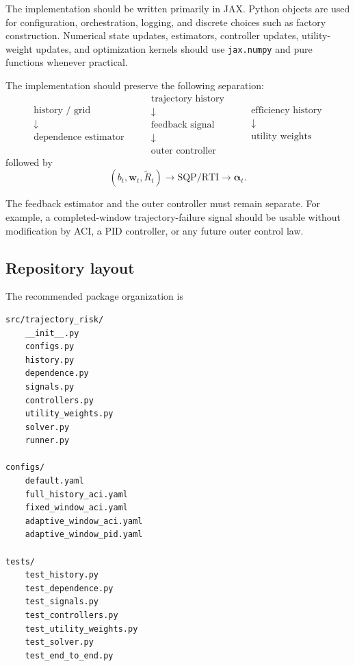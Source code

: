 \documentclass[11pt]{article}
\begin{document}
The implementation should be written primarily in JAX.  Python objects are
used for configuration, orchestration, logging, and discrete choices such as
factory construction.  Numerical state updates, estimators, controller
updates, utility-weight updates, and optimization kernels should use
\texttt{jax.numpy} and pure functions whenever practical.

The implementation should preserve the following separation:
\[
\boxed{
\begin{array}{c}
\text{history / grid}
\\
\downarrow
\\
\text{dependence estimator}
\end{array}
\qquad
\begin{array}{c}
\text{trajectory history}
\\
\downarrow
\\
\text{feedback signal}
\\
\downarrow
\\
\text{outer controller}
\end{array}
\qquad
\begin{array}{c}
\text{efficiency history}
\\
\downarrow
\\
\text{utility weights}
\end{array}
}
\]
followed by
\[
\boxed{
(b_t,\bm w_t,\widetilde R_t)
\longrightarrow
\text{SQP/RTI}
\longrightarrow
\bm\alpha_t.
}
\]

The feedback estimator and the outer controller must remain separate.  For
example, a completed-window trajectory-failure signal should be usable without
modification by ACI, a PID controller, or any future outer control law.

\subsection{Repository layout}

The recommended package organization is

\begin{verbatim}
src/trajectory_risk/
    __init__.py
    configs.py
    history.py
    dependence.py
    signals.py
    controllers.py
    utility_weights.py
    solver.py
    runner.py

configs/
    default.yaml
    full_history_aci.yaml
    fixed_window_aci.yaml
    adaptive_window_aci.yaml
    adaptive_window_pid.yaml

tests/
    test_history.py
    test_dependence.py
    test_signals.py
    test_controllers.py
    test_utility_weights.py
    test_solver.py
    test_end_to_end.py
\end{verbatim}
\end{document}
